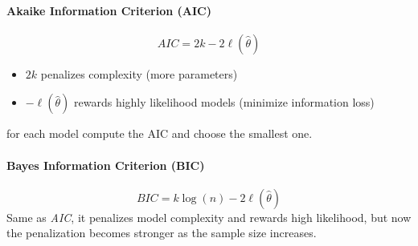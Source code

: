 \paragraph{Akaike Information Criterion (AIC)}
\begin{equation*}
    AIC = 2k -2\ell(\hat{\theta})
\end{equation*}
\begin{itemize}
    \item $2k$ penalizes complexity (more parameters)
    \item $-\ell(\hat{\theta})$ rewards highly likelihood models (minimize information loss)
\end{itemize}
\arrow for each model compute the AIC and choose the smallest one.

\paragraph{Bayes Information Criterion (BIC)}
\begin{equation*}
    BIC = k\log(n) -2\ell(\hat{\theta})
\end{equation*}
Same as \textit{AIC}, it penalizes model complexity and rewards high likelihood, but now the
penalization becomes stronger as the sample size increases.